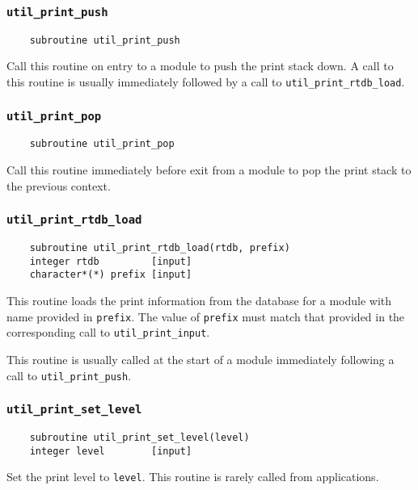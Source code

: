 \subsubsection{{\tt util\_print\_push}}
\begin{verbatim}
    subroutine util_print_push
\end{verbatim}
Call this routine on entry to a module to push the print stack down.
A call to this routine is usually immediately followed by a call to
\verb+util_print_rtdb_load+. 

\subsubsection{{\tt util\_print\_pop}}
\begin{verbatim}
    subroutine util_print_pop
\end{verbatim}
Call this routine immediately before exit from a module to pop the
print stack to the previous context.

\subsubsection{{\tt util\_print\_rtdb\_load}}
\begin{verbatim}
    subroutine util_print_rtdb_load(rtdb, prefix)
    integer rtdb         [input]
    character*(*) prefix [input]
\end{verbatim}
This routine loads the print information from the database for a
module with name provided in \verb+prefix+.  The value of
\verb+prefix+ must match that provided in the corresponding call to
\verb+util_print_input+.

This routine is usually called at the start of a module immediately
following a call to \verb+util_print_push+.

\subsubsection{{\tt util\_print\_set\_level}}
\begin{verbatim}
    subroutine util_print_set_level(level)
    integer level        [input]
\end{verbatim}
Set the print level to {\tt level}.  This routine is rarely called
from applications.

